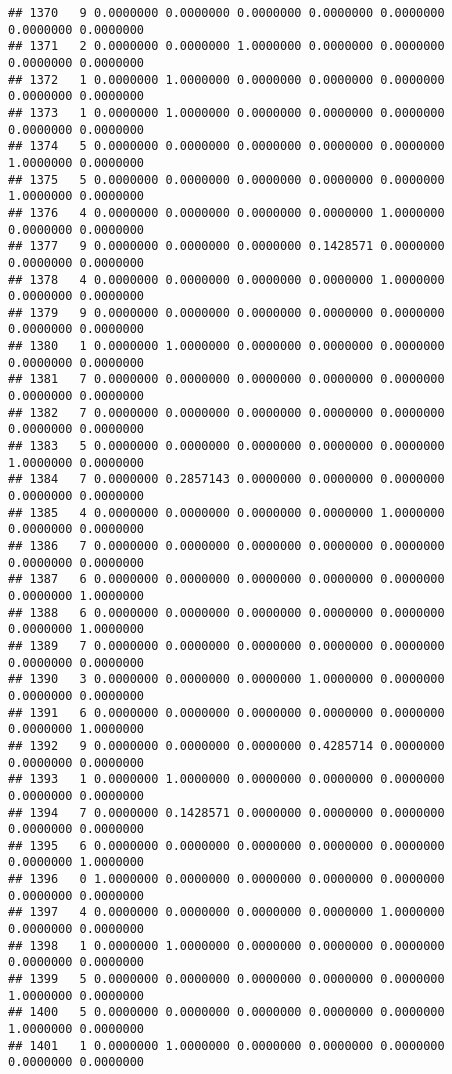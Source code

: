 \documentclass[
]{article}
\begin{document}
\begin{verbatim}
## 1370   9 0.0000000 0.0000000 0.0000000 0.0000000 0.0000000 0.0000000 0.0000000
## 1371   2 0.0000000 0.0000000 1.0000000 0.0000000 0.0000000 0.0000000 0.0000000
## 1372   1 0.0000000 1.0000000 0.0000000 0.0000000 0.0000000 0.0000000 0.0000000
## 1373   1 0.0000000 1.0000000 0.0000000 0.0000000 0.0000000 0.0000000 0.0000000
## 1374   5 0.0000000 0.0000000 0.0000000 0.0000000 0.0000000 1.0000000 0.0000000
## 1375   5 0.0000000 0.0000000 0.0000000 0.0000000 0.0000000 1.0000000 0.0000000
## 1376   4 0.0000000 0.0000000 0.0000000 0.0000000 1.0000000 0.0000000 0.0000000
## 1377   9 0.0000000 0.0000000 0.0000000 0.1428571 0.0000000 0.0000000 0.0000000
## 1378   4 0.0000000 0.0000000 0.0000000 0.0000000 1.0000000 0.0000000 0.0000000
## 1379   9 0.0000000 0.0000000 0.0000000 0.0000000 0.0000000 0.0000000 0.0000000
## 1380   1 0.0000000 1.0000000 0.0000000 0.0000000 0.0000000 0.0000000 0.0000000
## 1381   7 0.0000000 0.0000000 0.0000000 0.0000000 0.0000000 0.0000000 0.0000000
## 1382   7 0.0000000 0.0000000 0.0000000 0.0000000 0.0000000 0.0000000 0.0000000
## 1383   5 0.0000000 0.0000000 0.0000000 0.0000000 0.0000000 1.0000000 0.0000000
## 1384   7 0.0000000 0.2857143 0.0000000 0.0000000 0.0000000 0.0000000 0.0000000
## 1385   4 0.0000000 0.0000000 0.0000000 0.0000000 1.0000000 0.0000000 0.0000000
## 1386   7 0.0000000 0.0000000 0.0000000 0.0000000 0.0000000 0.0000000 0.0000000
## 1387   6 0.0000000 0.0000000 0.0000000 0.0000000 0.0000000 0.0000000 1.0000000
## 1388   6 0.0000000 0.0000000 0.0000000 0.0000000 0.0000000 0.0000000 1.0000000
## 1389   7 0.0000000 0.0000000 0.0000000 0.0000000 0.0000000 0.0000000 0.0000000
## 1390   3 0.0000000 0.0000000 0.0000000 1.0000000 0.0000000 0.0000000 0.0000000
## 1391   6 0.0000000 0.0000000 0.0000000 0.0000000 0.0000000 0.0000000 1.0000000
## 1392   9 0.0000000 0.0000000 0.0000000 0.4285714 0.0000000 0.0000000 0.0000000
## 1393   1 0.0000000 1.0000000 0.0000000 0.0000000 0.0000000 0.0000000 0.0000000
## 1394   7 0.0000000 0.1428571 0.0000000 0.0000000 0.0000000 0.0000000 0.0000000
## 1395   6 0.0000000 0.0000000 0.0000000 0.0000000 0.0000000 0.0000000 1.0000000
## 1396   0 1.0000000 0.0000000 0.0000000 0.0000000 0.0000000 0.0000000 0.0000000
## 1397   4 0.0000000 0.0000000 0.0000000 0.0000000 1.0000000 0.0000000 0.0000000
## 1398   1 0.0000000 1.0000000 0.0000000 0.0000000 0.0000000 0.0000000 0.0000000
## 1399   5 0.0000000 0.0000000 0.0000000 0.0000000 0.0000000 1.0000000 0.0000000
## 1400   5 0.0000000 0.0000000 0.0000000 0.0000000 0.0000000 1.0000000 0.0000000
## 1401   1 0.0000000 1.0000000 0.0000000 0.0000000 0.0000000 0.0000000 0.0000000

\end{verbatim}
\end{document}
